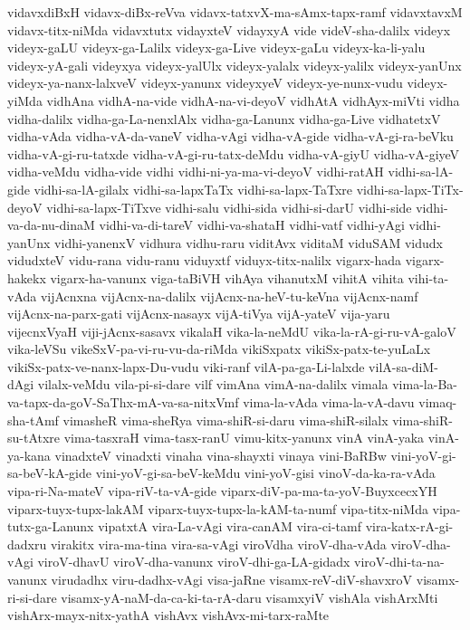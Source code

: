 {vidavxdiBxH
vidavx-diBx-reVva
vidavx-tatxvX-ma-sAmx-tapx-ramf
vidavxtavxM
vidavx-titx-niMda
vidavxtutx
vidayxteV
vidayxyA
vide
videV-sha-dalilx
videyx
videyx-gaLU
videyx-ga-Lalilx
videyx-ga-Live
videyx-gaLu
videyx-ka-li-yalu
videyx-yA-gali
videyxya
videyx-yalUlx
videyx-yalalx
videyx-yalilx
videyx-yanUnx
videyx-ya-nanx-lalxveV
videyx-yanunx
videyxyeV
videyx-ye-nunx-vudu
videyx-yiMda
vidhAna
vidhA-na-vide
vidhA-na-vi-deyoV
vidhAtA
vidhAyx-miVti
vidha
vidha-dalilx
vidha-ga-La-nenxlAlx
vidha-ga-Lanunx
vidha-ga-Live
vidhatetxV
vidha-vAda
vidha-vA-da-vaneV
vidha-vAgi
vidha-vA-gide
vidha-vA-gi-ra-beVku
vidha-vA-gi-ru-tatxde
vidha-vA-gi-ru-tatx-deMdu
vidha-vA-giyU
vidha-vA-giyeV
vidha-veMdu
vidha-vide
vidhi
vidhi-ni-ya-ma-vi-deyoV
vidhi-ratAH
vidhi-sa-lA-gide
vidhi-sa-lA-gilalx
vidhi-sa-lapxTaTx
vidhi-sa-lapx-TaTxre
vidhi-sa-lapx-TiTx-deyoV
vidhi-sa-lapx-TiTxve
vidhi-salu
vidhi-sida
vidhi-si-darU
vidhi-side
vidhi-va-da-nu-dinaM
vidhi-va-di-tareV
vidhi-va-shataH
vidhi-vatf
vidhi-yAgi
vidhi-yanUnx
vidhi-yanenxV
vidhura
vidhu-raru
viditAvx
viditaM
viduSAM
vidudx
vidudxteV
vidu-rana
vidu-ranu
viduyxtf
viduyx-titx-nalilx
vigarx-hada
vigarx-hakekx
vigarx-ha-vanunx
viga-taBiVH
vihAya
vihanutxM
vihitA
vihita
vihi-ta-vAda
vijAcnxna
vijAcnx-na-dalilx
vijAcnx-na-heV-tu-keVna
vijAcnx-namf
vijAcnx-na-parx-gati
vijAcnx-nasayx
vijA-tiVya
vijA-yateV
vija-yaru
vijecnxVyaH
viji-jAcnx-sasavx
vikalaH
vika-la-neMdU
vika-la-rA-gi-ru-vA-galoV
vika-leVSu
vikeSxV-pa-vi-ru-vu-da-riMda
vikiSxpatx
vikiSx-patx-te-yuLaLx
vikiSx-patx-ve-nanx-lapx-Du-vudu
viki-ranf
vilA-pa-ga-Li-lalxde
vilA-sa-diM-dAgi
vilalx-veMdu
vila-pi-si-dare
vilf
vimAna
vimA-na-dalilx
vimala
vima-la-Ba-va-tapx-da-goV-SaThx-mA-va-sa-nitxVmf
vima-la-vAda
vima-la-vA-davu
vimaq-sha-tAmf
vimasheR
vima-sheRya
vima-shiR-si-daru
vima-shiR-silalx
vima-shiR-su-tAtxre
vima-tasxraH
vima-tasx-ranU
vimu-kitx-yanunx
vinA
vinA-yaka
vinA-ya-kana
vinadxteV
vinadxti
vinaha
vina-shayxti
vinaya
vini-BaRBw
vini-yoV-gi-sa-beV-kA-gide
vini-yoV-gi-sa-beV-keMdu
vini-yoV-gisi
vinoV-da-ka-ra-vAda
vipa-ri-Na-mateV
vipa-riV-ta-vA-gide
viparx-diV-pa-ma-ta-yoV-BuyxcecxYH
viparx-tuyx-tupx-lakAM
viparx-tuyx-tupx-la-kAM-ta-numf
vipa-titx-niMda
vipa-tutx-ga-Lanunx
vipatxtA
vira-La-vAgi
vira-canAM
vira-ci-tamf
vira-katx-rA-gi-dadxru
virakitx
vira-ma-tina
vira-sa-vAgi
viroVdha
viroV-dha-vAda
viroV-dha-vAgi
viroV-dhavU
viroV-dha-vanunx
viroV-dhi-ga-LA-gidadx
viroV-dhi-ta-na-vanunx
virudadhx
viru-dadhx-vAgi
visa-jaRne
visamx-reV-diV-shavxroV
visamx-ri-si-dare
visamx-yA-naM-da-ca-ki-ta-rA-daru
visamxyiV
vishAla
vishArxMti
vishArx-mayx-nitx-yathA
vishAvx
vishAvx-mi-tarx-raMte
}
